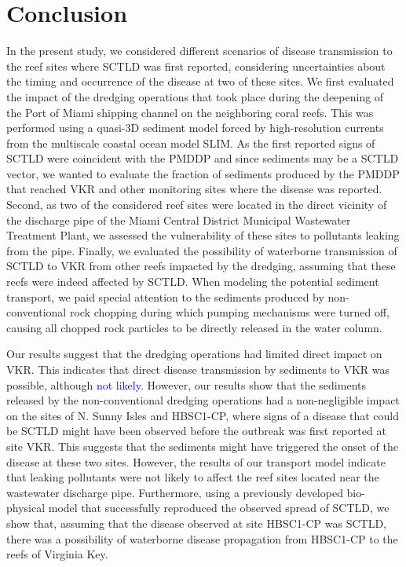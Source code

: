 \documentclass[preprint,12pt,authoryear]{elsarticle}
\newcommand{\modif}[1]{\textcolor{blue}{#1}}
\begin{document}
\section{Conclusion}

In the present study, we considered different scenarios of disease transmission to the reef sites where SCTLD was first reported, considering uncertainties about the timing and occurrence of the disease at two of these sites. We first evaluated the impact of the dredging operations that took place during the deepening of the Port of Miami shipping channel on the neighboring coral reefs. This was performed using a quasi-3D sediment model forced by high-resolution currents from the multiscale coastal ocean model SLIM. As the first reported signs of SCTLD were coincident with the PMDDP and since sediments may be a SCTLD vector, we wanted to evaluate the fraction of sediments produced by the PMDDP that reached VKR and other monitoring sites where the disease was reported. Second, as two of the considered reef sites were located in the direct vicinity of the discharge pipe of the Miami Central District Municipal Wastewater Treatment Plant, we assessed the vulnerability of these sites to pollutants leaking from the pipe. Finally, we evaluated the possibility of waterborne transmission of SCTLD to VKR from other reefs impacted by the dredging, assuming that these reefs were indeed affected by SCTLD. When modeling the potential sediment transport, we paid special attention to the sediments produced by non-conventional rock chopping during which pumping mechanisms were turned off, causing all chopped rock particles to be directly released in the water column.

Our results suggest that the dredging operations had limited direct impact on VKR. This indicates that direct disease transmission by sediments to VKR was possible, although \modif{not likely}. However, our results show that the sediments released by the non-conventional dredging operations had a non-negligible impact on the sites of N. Sunny Isles and HBSC1-CP, where signs of a disease that could be SCTLD might have been observed before the outbreak was first reported at site VKR. This suggests that the sediments might have triggered the onset of the disease at these two sites. However, the results of our transport model indicate that leaking pollutants were not likely to affect the reef sites located near the wastewater discharge pipe. Furthermore, using a previously developed bio-physical model that successfully reproduced the observed spread of SCTLD, we show that, assuming that the disease observed at site HBSC1-CP was SCTLD, there was a possibility of waterborne disease propagation from HBSC1-CP to the reefs of Virginia Key.
\end{document}

